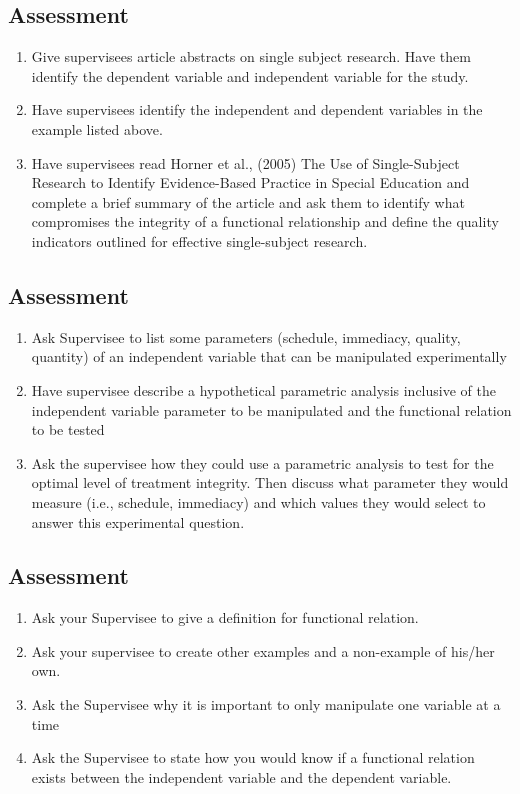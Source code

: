 \subsection{Assessment}
\begin{enumerate}
\item Give supervisees article abstracts on single subject research. Have them identify the dependent variable and independent variable for the study.
\item Have supervisees identify the independent and dependent variables in the example listed above.
\item Have supervisees read Horner et al., (2005) The Use of Single-Subject Research to Identify Evidence-Based Practice in Special Education and complete a brief summary of the article and ask them to identify what compromises the integrity of a functional relationship and define the quality indicators outlined for effective single-subject research.
\end{enumerate}
%
\subsection{Assessment}
\begin{enumerate}
\item Ask Supervisee to list some parameters (schedule, immediacy, quality, quantity) of an independent variable that can be manipulated experimentally
\item Have supervisee describe a hypothetical parametric analysis inclusive of the independent variable parameter to be manipulated and the functional relation to be tested 
\item Ask the supervisee how they could use a parametric analysis to test for the optimal level of treatment integrity. Then discuss what parameter they would measure (i.e., schedule, immediacy) and which values they would select to answer this experimental question.  
\end{enumerate}
%
\subsection{Assessment}
\begin{enumerate}
\item Ask your Supervisee to give a definition for functional relation.
\item Ask your supervisee to create other examples and a non-example of his/her own. 
\item Ask the Supervisee why it is important to only manipulate one variable at a time
\item Ask the Supervisee to state how you would know if a functional relation exists between the independent variable and the dependent variable. 
%
\end{enumerate}
%
